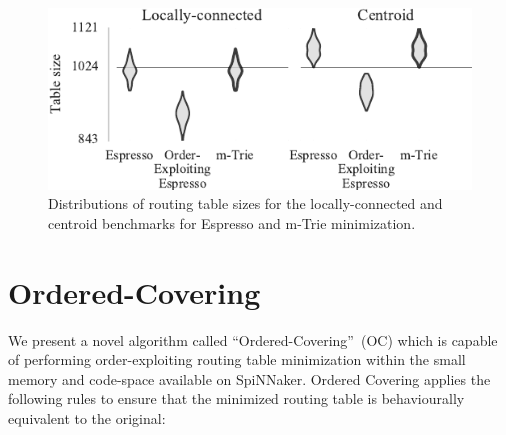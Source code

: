 \documentclass[conference]{IEEEtran}
\begin{document}
\begin{figure}
  \centering
  \includegraphics{experiments/results_with_mtrie}
  \caption{
    Distributions of routing table sizes for the locally-connected and centroid benchmarks for Espresso and m-Trie minimization.
  }
  \label{fig:results/results_with_mtrie}
\end{figure}

\section{Ordered-Covering}

We present a novel algorithm called ``Ordered-Covering''~(OC) which is capable of performing order-exploiting routing table minimization within the small memory and code-space available on SpiNNaker.
Ordered Covering applies the following rules to ensure that the minimized routing table is behaviourally equivalent to the original:
\end{document}

